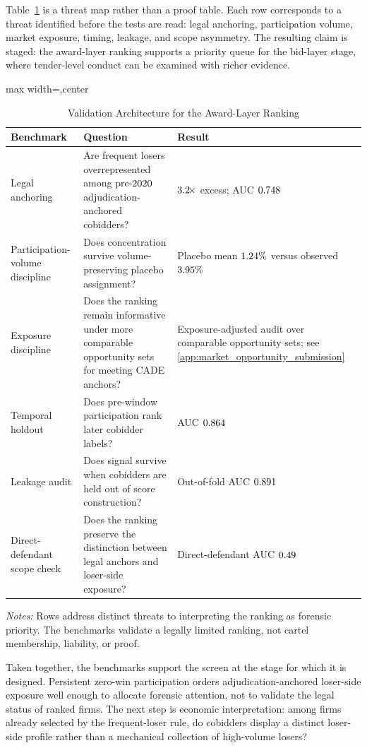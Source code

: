 Table~\ref{tab:validation_benchmarks_submission} is a threat map
rather than a proof table. Each row corresponds to a threat
identified before the tests are read: legal anchoring,
participation volume, market exposure, timing, leakage, and
scope asymmetry. The resulting claim is staged: the award-layer
ranking supports a priority queue for the bid-layer stage, where
tender-level conduct can be examined with richer evidence.

\begin{table}[htbp]
\centering
\caption{Validation Architecture for the Award-Layer Ranking}
\label{tab:validation_benchmarks_submission}
\footnotesize
\begin{adjustbox}{max width=\textwidth,center}
\begin{threeparttable}
\begin{tabular}{p{3.5cm}p{5.3cm}p{4.3cm}}
\toprule
Benchmark & Question & Result \\
\midrule
Legal anchoring & Are frequent losers overrepresented among pre-$2020$ adjudication-anchored cobidders? & $3.2\!\times$ excess; AUC $0.748$ \\
Participation-volume discipline & Does concentration survive volume-preserving placebo assignment? & Placebo mean $1.24\%$ versus observed $3.95\%$ \\
Exposure discipline & Does the ranking remain informative under more comparable opportunity sets for meeting CADE anchors? & Exposure-adjusted audit over comparable opportunity sets; see \ref{app:market_opportunity_submission} \\
Temporal holdout & Does pre-window participation rank later cobidder labels? & AUC $0.864$ \\
Leakage audit & Does signal survive when cobidders are held out of score construction? & Out-of-fold AUC $0.891$ \\
Direct-defendant scope check & Does the ranking preserve the distinction between legal anchors and loser-side exposure? & Direct-defendant AUC $0.49$ \\
\bottomrule
\end{tabular}
\begin{tablenotes}
\footnotesize
\item \textit{Notes:} Rows address distinct threats to
interpreting the ranking as forensic priority. The benchmarks
validate a legally limited ranking, not cartel membership,
liability, or proof.
\end{tablenotes}
\end{threeparttable}
\end{adjustbox}
\end{table}

Taken together, the benchmarks support the screen at the stage
for which it is designed. Persistent zero-win participation
orders adjudication-anchored loser-side exposure well enough to
allocate forensic attention, not to validate the legal status of
ranked firms. The next step is economic interpretation: among
firms already selected by the frequent-loser rule, do cobidders
display a distinct loser-side profile rather than a mechanical
collection of high-volume losers?
